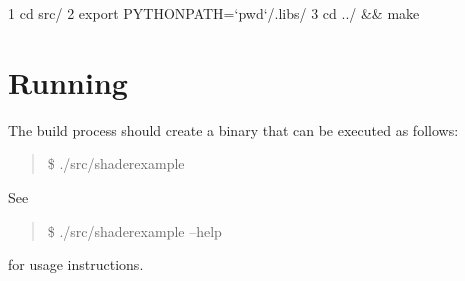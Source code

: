 \begin{DoxyCode}
1 cd src/
2 export PYTHONPATH=`pwd`/.libs/
3 cd ../ && make
\end{DoxyCode}


\section*{Running}

The build process should create a binary that can be executed as follows\+:

\begin{quote}
\$ ./src/shaderexample \end{quote}


See

\begin{quote}
\$ ./src/shaderexample --help \end{quote}


for usage instructions. 